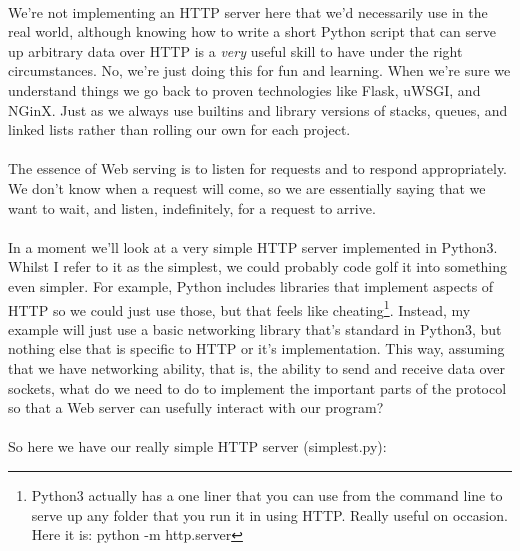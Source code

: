 \paragraph{} We're not implementing an HTTP server here that we'd necessarily use in the real world, although knowing how to write a short Python script that can serve up arbitrary data over HTTP is a \emph{very} useful skill to have under the right circumstances. No, we're just doing this for fun and learning. When we're sure we understand things we go back to proven technologies like Flask, uWSGI, and NGinX. Just as we always use builtins and library versions of stacks, queues, and linked lists rather than rolling our own for each project.

\paragraph{} The essence of Web serving is to listen for requests and to respond appropriately. We don't know when a request will come, so we are essentially saying that we want to wait, and listen, indefinitely, for a request to arrive.

\paragraph{} In a moment we'll look at a very simple HTTP server implemented in Python3. Whilst I refer to it as the simplest, we could probably code golf it into something even simpler. For example, Python includes libraries that implement aspects of HTTP so we could just use those, but that feels like cheating\footnote{Python3 actually has a one liner that you can use from the command line to serve up any folder that you run it in using HTTP. Really useful on occasion. Here it is: python -m http.server}. Instead, my example will just use a basic networking library that's standard in Python3, but nothing else that is specific to HTTP or it's implementation. This way, assuming that we have networking ability, that is, the ability to send and receive data over sockets, what do we need to do to implement the important parts of the protocol so that a Web server can usefully interact with our program?

\paragraph{} So here we have our really simple HTTP server (simplest.py):

